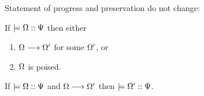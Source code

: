 Statement of progress and preservation do not change:

\begin{conjecture}[Progress]
If $\models {\Omega} :: {\Psi}$ then either
\begin{enumerate}
  \item $\Omega \longrightarrow \Omega'$ for some $\Omega'$, or
  \item $\Omega$ is poised.
\end{enumerate}
\end{conjecture}

\begin{conjecture}[Preservation]
If $\models {\Omega} :: {\Psi}$ and $\Omega \longrightarrow \Omega'$ then $\models {\Omega'} :: {\Psi}$.
\end{conjecture}


